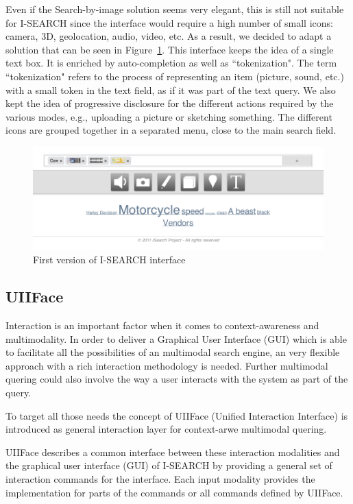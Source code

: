 \documentclass[runningheads,a4paper]{llncs} \usepackage[utf8]{inputenc}
\begin{document}
Even if the Search-by-image solution seems very elegant, this is still not suitable for \mbox{I-SEARCH} since the interface would require a high number of small icons: camera, 3D, geolocation, audio, video, etc.  As a result, we decided to adapt a solution that can be seen in Figure~\ref{fig:isearch-ui}. This interface keeps the idea of a single text box. It is enriched by auto-completion as well as ``tokenization". The term ``tokenization" refers to the process of representing an item (picture, sound, etc.) with a small token in the text field, as if it was part of the text query. We also kept the idea of progressive disclosure for the different actions required by the various modes, e.g., uploading a picture or sketching something. The different icons are grouped together in a separated menu, close to the main search field.

\begin{figure}[h!]
  \centering
    \includegraphics[width=0.8\linewidth]{resources/isearch-UI.png}
  \caption{First version of \mbox{I-SEARCH} interface}
  \label{fig:isearch-ui}
\end{figure}

\subsection{UIIFace}

Interaction is an important factor when it comes to context-awareness and
multimodality. In order to deliver a Graphical User Interface (GUI) which is
able to facilitate all the possibilities of an multimodal search engine, an
very flexible approach with a rich interaction methodology is needed. 
Further multimodal quering could also involve the way a user interacts with the
system as part of the query. 

To target all those needs the concept of UIIFace (Unified Interaction Interface)
is introduced as general interaction layer for context-arwe multimodal quering.

UIIFace describes a common interface between these interaction modalities and the 
graphical user interface (GUI) of \mbox{I-SEARCH} by providing a general set of interaction 
commands for the interface. Each input modality provides the implementation 
for parts of the commands or all commands defined by UIIFace. 
\end{document}
